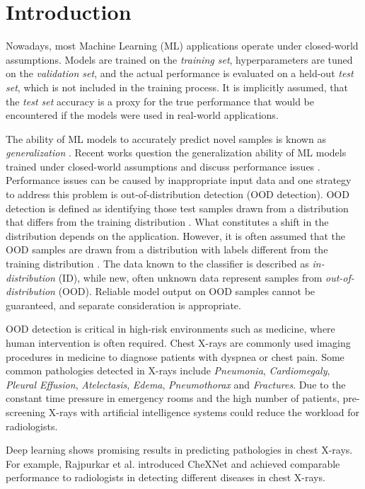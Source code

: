\section{Introduction}
\raggedbottom
Nowadays, most Machine Learning (ML) applications operate under closed-world assumptions.
Models are trained on the \textit{training set}, hyperparameters are tuned on the \textit{validation set}, and the actual performance is evaluated on a held-out \textit{test set}, which is not included in the training process.
It is implicitly assumed, that the \textit{test set} accuracy is a proxy for the true performance that would be encountered if the models were used in real-world applications.
\par
The ability of ML models to accurately predict novel samples is known as \textit{generalization} \citep{Bishop2006}.
Recent works question the generalization ability of ML models trained under closed-world assumptions and discuss performance issues \citep{Recht2018,Zech2018}.
Performance issues can be caused by inappropriate input data and one strategy to address this problem is out-of-distribution detection (OOD detection).
OOD detection is defined as identifying those test samples drawn from a distribution that differs from the training distribution \citep{Yang2021}.
What constitutes a shift in the distribution depends on the application.
However, it is often assumed that the OOD samples are drawn from a distribution with labels different from the training distribution \citep{Yang2021}.
The data known to the classifier is described as \textit{in-distribution} (ID), while new, often unknown data represent samples from \textit{out-of-distribution} (OOD).
Reliable model output on OOD samples cannot be guaranteed, and separate consideration is appropriate.
\par
OOD detection is critical in high-risk environments such as medicine, where human intervention is often required.
Chest X-rays are commonly used imaging procedures in medicine to diagnose patients with dyspnea or chest pain.
Some common pathologies detected in X-rays include \textit{Pneumonia}, \textit{Cardiomegaly}, \textit{Pleural Effusion}, \textit{Atelectasis}, \textit{Edema}, \textit{Pneumothorax} and \textit{Fractures}.
Due to the constant time pressure in emergency rooms and the high number of patients, pre-screening X-rays with artificial intelligence systems could reduce the workload for radiologists. 
\par
Deep learning shows promising results in predicting pathologies in chest X-rays.
For example, Rajpurkar et al. \citep{Rajpurkar2017} introduced CheXNet and achieved comparable performance to radiologists in detecting different diseases in chest X-rays.
